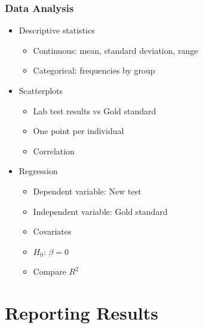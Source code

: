 \documentclass[xcolor=dvipsnames]{beamer}
\begin{document}
\begin{frame}
\frametitle{Data Analysis}
\begin{itemize}
\item Descriptive statistics
	\begin{itemize}
	\item Continuous: mean, standard deviation, range
	\item Categorical: frequencies by group
	\end{itemize}
\item Scatterplots
	\begin{itemize}
	\item Lab test results vs Gold standard
	\item One point per individual
	\item Correlation
	\end{itemize}
\item Regression
	\begin{itemize}
	\item Dependent variable: New test
	\item Independent variable: Gold standard
	\item Covariates
	\item $H_{0}$: $\beta = 0$
	\item Compare $R^2$
	\end{itemize}
\end{itemize}
\end{frame}



\section{Reporting Results}
\end{document}
